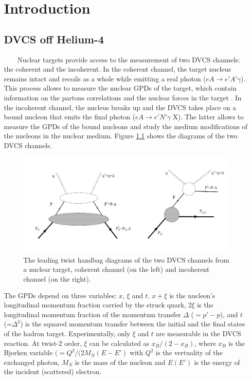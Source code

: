 \chapter{Introduction} \label{Nuclear_DVCS}
\section{DVCS off Helium-4} \label{Nuclear_DVCS}
~~~~Nuclear targets provide access to the measurement of two DVCS channels: the coherent and the incoherent. In the coherent channel, the target nucleus remains intact and recoils as a whole while emitting a real photon ($eA \rightarrow e' A' \gamma$). This process allows to measure the nuclear GPDs of the target, which contain information on the partons correlations and the nuclear forces in the target \cite{M_Polyakov,EMC_simonetta}. In the incoherent channel, the nucleus breaks up and the DVCS takes place on a bound nucleon that emits the final photon ($eA \rightarrow e' N' \gamma$ X). The latter allows to measure the GPDs of the bound nucleons and study the medium modifications of the nucleons in the nuclear medium. Figure \ref{fig:nuclear_DVCS} shows the diagrams of the two DVCS channels. \\
\begin{figure}[tbp]
\centering
\includegraphics[scale=0.3]{fig/nuclear_DVCS.png}
\caption{The leading twist handbag diagrams of the two DVCS channels from a nuclear target, coherent channel (on the left) and incoherent channel (on the right). } 
\label{fig:nuclear_DVCS}
\end{figure}

The GPDs depend on three variables: $x$, $\xi$ and $t$. $x+\xi$ is the 
nucleon's longitudinal momentum fraction carried by the struck quark, 2$\xi$ is 
the longitudinal momentum fraction of the momentum transfer $\Delta$ ($= p' - 
p$), and $t$ (=$\Delta^{2}$) is the squared momentum transfer between the 
initial and the final states of the hadron target. Experimentally, only $\xi$ 
and $t$ are measurable in the DVCS reaction. At twist-2 order, $\xi$ can be 
calculated as $x_B/(2-x_B)$, where $x_B$ is the Bjorken variable $(= 
Q^{2}/(2M_{N}(E-E')$ with $Q^2$ is the vertuality of the exchanged photon, 
$M_{N}$ is the mass of the nucleon and $E(E')$ is the energy of the incident 
(scattered) electron.\\

